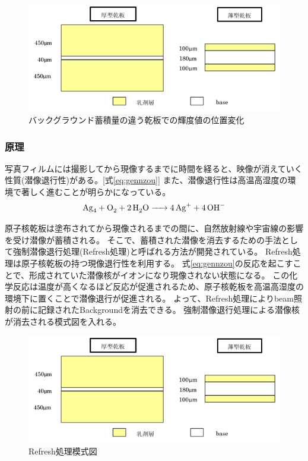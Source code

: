 \documentclass[12pt,a4paper]{jarticle}
\begin{document}
\begin{figure}[htbp]
    \begin{center}
     \includegraphics[width=140mm]{emulsionorder.png}
    \end{center}
    \caption{バックグラウンド蓄積量の違う乾板での輝度値の位置変化\label{fig:britnese_in_some_emulsion}}
\end{figure}
\newpage
\subsubsection{原理}
写真フィルムには撮影してから現像するまでに時間を経ると、映像が消えていく性質(潜像退行性)がある。[式\ref{eq:gennzou}]
また、潜像退行性は高温高湿度の環境で著しく進むことが明らかになっている。
\begin{equation}
    \ce{Ag4 + O2 + 2H2O -> 4Ag+ + 4OH-}
\label{eq:gennzou}
\end{equation}
\par
原子核乾板は塗布されてから現像されるまでの間に、自然放射線や宇宙線の影響を受け潜像が蓄積される。
そこで、蓄積された潜像を消去するための手法として強制潜像退行処理(Refresh処理)と呼ばれる方法が開発されている。
\cite{takusann}
Refresh処理は原子核乾板の持つ現像退行性を利用する。
式\ref{eq:gennzou}の反応を起こすことで、形成されていた潜像核がイオンになり現像されない状態になる。
この化学反応は温度が高くなるほど反応が促進されるため、原子核乾板を高温高湿度の環境下に置くことで潜像退行が促進される。
よって、Refresh処理によりbeam照射の前に記録されたBackgroundを消去できる。
強制潜像退行処理による潜像核が消去される模式図を入れる。
\begin{figure}[htbp]
    \begin{center}
     \includegraphics[width=140mm]{emulsionorder.png}
    \end{center}
    \caption{Refresh処理模式図\label{fig:intr_refresh}}
\end{figure}
\end{document}
